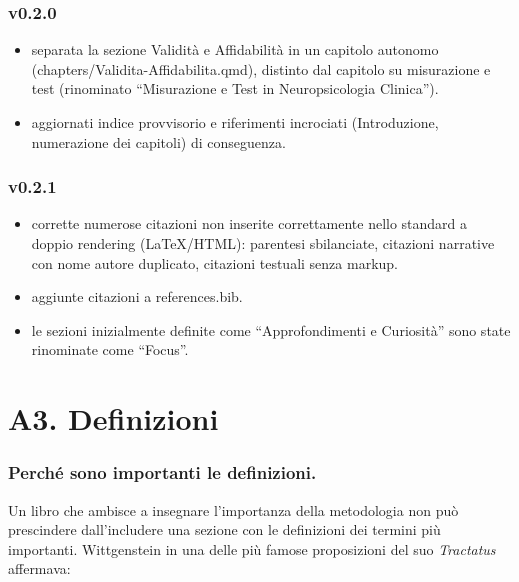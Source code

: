 \documentclass[
  italian,
  letterpaper,
  paper=A4,
  headinclude=on,
  footinclude=on,
  12pt]{scrbook}
\providecommand{\tightlist}{%
  \setlength{\itemsep}{0pt}\setlength{\parskip}{0pt}}
\begin{document}
\subsection*{v0.2.0}\label{v0.2.0}

\begin{itemize}
\tightlist
\item
  separata la sezione Validità e Affidabilità in un capitolo autonomo
  (chapters/Validita-Affidabilita.qmd), distinto dal capitolo su
  misurazione e test (rinominato ``Misurazione e Test in Neuropsicologia
  Clinica'').
\item
  aggiornati indice provvisorio e riferimenti incrociati (Introduzione,
  numerazione dei capitoli) di conseguenza.
\end{itemize}

\subsection*{v0.2.1}\label{v0.2.1}

\begin{itemize}
\tightlist
\item
  corrette numerose citazioni non inserite correttamente nello standard
  a doppio rendering (LaTeX/HTML): parentesi sbilanciate, citazioni
  narrative con nome autore duplicato, citazioni testuali senza markup.
\item
  aggiunte citazioni a references.bib.
\item
  le sezioni inizialmente definite come ``Approfondimenti e Curiosità''
  sono state rinominate come ``Focus''.
\end{itemize}

\chapter*{A3. Definizioni}\label{definizioni}


\subsection*{Perché sono importanti le
definizioni.}\label{perchuxe9-sono-importanti-le-definizioni.}

Un libro che ambisce a insegnare l'importanza della metodologia non può
prescindere dall'includere una sezione con le definizioni dei termini
più importanti. Wittgenstein in una delle più famose proposizioni del
suo \emph{Tractatus} affermava:
\end{document}
